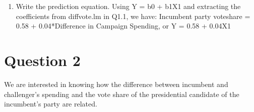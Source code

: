 \documentclass[12pt,letterpaper]{article}
\begin{document}
\begin{enumerate}
\begin{figure}[h!]
\end{figure}
		\item Write the prediction equation.
\noindent Using Y = b0 + b1X1 and extracting the coefficients from diffvote.lm in Q1.1, we have: Incumbent party voteshare = 0.58 + 0.04*Difference in Campaign Spending, or Y = 0.58 + 0.04X1\\
	\end{enumerate}
	
\newpage

\section*{Question 2}
\noindent We are interested in knowing how the difference between incumbent and challenger's spending and the vote share of the presidential candidate of the incumbent's party are related.\\
\end{document}
